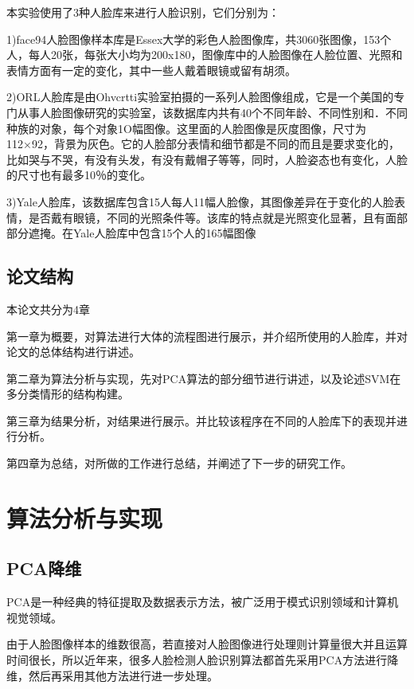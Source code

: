 \documentclass[a4paper,12pt]{ctexart}
\begin{document}
本实验使用了3种人脸库来进行人脸识别，它们分别为：

1)\quad face94人脸图像样本库是Essex大学的彩色人脸图像库，共3060张图像，153个人，每人20张，每张大小均为200x180，图像库中的人脸图像在人脸位置、光照和表情方面有一定的变化，其中一些人戴着眼镜或留有胡须。

2)\quad ORL人脸库是由Ohvcrtti实验室拍摄的一系列人脸图像组成，它是一个美国的专门从事人脸图像研究的实验室，该数据库内共有40个不同年龄、不同性别和．不同种族的对象，每个对象1O幅图像。这里面的人脸图像是灰度图像，尺寸为112×92，背景为灰色。它的人脸部分表情和细节都是不同的而且是要求变化的，比如哭与不哭，有没有头发，有没有戴帽子等等，同时，人脸姿态也有变化，人脸的尺寸也有最多10％的变化。


3)\quad Yale人脸库，该数据库包含15人每人11幅人脸像，其图像差异在于变化的人脸表情，是否戴有眼镜，不同的光照条件等。该库的特点就是光照变化显著，且有面部部分遮掩。在Yale人脸库中包含15个人的165幅图像


\subsection{论文结构}
本论文共分为4章

第一章为概要，对算法进行大体的流程图进行展示，并介绍所使用的人脸库，并对论文的总体结构进行讲述。

第二章为算法分析与实现，先对PCA算法的部分细节进行讲述，以及论述SVM在多分类情形的结构构建。

第三章为结果分析，对结果进行展示。并比较该程序在不同的人脸库下的表现并进行分析。

第四章为总结，对所做的工作进行总结，并阐述了下一步的研究工作。

\newpage
\section{算法分析与实现}

\subsection{PCA降维}
PCA是一种经典的特征提取及数据表示方法，被广泛用于模式识别领域和计算机视觉领域。

由于人脸图像样本的维数很高，若直接对人脸图像进行处理则计算量很大并且运算时间很长，所以近年来，很多人脸检测人脸识别算法都首先采用PCA方法进行降维，然后再采用其他方法进行进一步处理。
\end{document}
